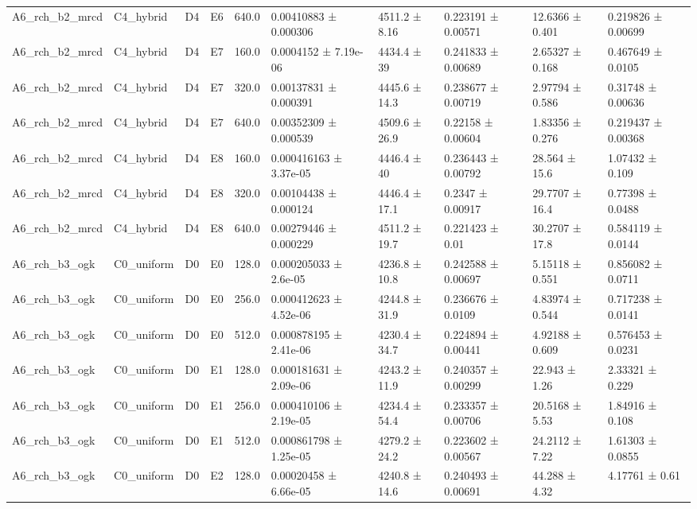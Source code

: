 \begin{table}
\begin{tabular}{llllllllll}
A6\_rch\_b2\_mrcd & C4\_hybrid & D4 & E6 & 640.0 & 0.00410883 ± 0.000306 & 4511.2 ± 8.16 & 0.223191 ± 0.00571 & 12.6366 ± 0.401 & 0.219826 ± 0.00699 \\
A6\_rch\_b2\_mrcd & C4\_hybrid & D4 & E7 & 160.0 & 0.0004152 ± 7.19e-06 & 4434.4 ± 39 & 0.241833 ± 0.00689 & 2.65327 ± 0.168 & 0.467649 ± 0.0105 \\
A6\_rch\_b2\_mrcd & C4\_hybrid & D4 & E7 & 320.0 & 0.00137831 ± 0.000391 & 4445.6 ± 14.3 & 0.238677 ± 0.00719 & 2.97794 ± 0.586 & 0.31748 ± 0.00636 \\
A6\_rch\_b2\_mrcd & C4\_hybrid & D4 & E7 & 640.0 & 0.00352309 ± 0.000539 & 4509.6 ± 26.9 & 0.22158 ± 0.00604 & 1.83356 ± 0.276 & 0.219437 ± 0.00368 \\
A6\_rch\_b2\_mrcd & C4\_hybrid & D4 & E8 & 160.0 & 0.000416163 ± 3.37e-05 & 4446.4 ± 40 & 0.236443 ± 0.00792 & 28.564 ± 15.6 & 1.07432 ± 0.109 \\
A6\_rch\_b2\_mrcd & C4\_hybrid & D4 & E8 & 320.0 & 0.00104438 ± 0.000124 & 4446.4 ± 17.1 & 0.2347 ± 0.00917 & 29.7707 ± 16.4 & 0.77398 ± 0.0488 \\
A6\_rch\_b2\_mrcd & C4\_hybrid & D4 & E8 & 640.0 & 0.00279446 ± 0.000229 & 4511.2 ± 19.7 & 0.221423 ± 0.01 & 30.2707 ± 17.8 & 0.584119 ± 0.0144 \\
A6\_rch\_b3\_ogk & C0\_uniform & D0 & E0 & 128.0 & 0.000205033 ± 2.6e-05 & 4236.8 ± 10.8 & 0.242588 ± 0.00697 & 5.15118 ± 0.551 & 0.856082 ± 0.0711 \\
A6\_rch\_b3\_ogk & C0\_uniform & D0 & E0 & 256.0 & 0.000412623 ± 4.52e-06 & 4244.8 ± 31.9 & 0.236676 ± 0.0109 & 4.83974 ± 0.544 & 0.717238 ± 0.0141 \\
A6\_rch\_b3\_ogk & C0\_uniform & D0 & E0 & 512.0 & 0.000878195 ± 2.41e-06 & 4230.4 ± 34.7 & 0.224894 ± 0.00441 & 4.92188 ± 0.609 & 0.576453 ± 0.0231 \\
A6\_rch\_b3\_ogk & C0\_uniform & D0 & E1 & 128.0 & 0.000181631 ± 2.09e-06 & 4243.2 ± 11.9 & 0.240357 ± 0.00299 & 22.943 ± 1.26 & 2.33321 ± 0.229 \\
A6\_rch\_b3\_ogk & C0\_uniform & D0 & E1 & 256.0 & 0.000410106 ± 2.19e-05 & 4234.4 ± 54.4 & 0.233357 ± 0.00706 & 20.5168 ± 5.53 & 1.84916 ± 0.108 \\
A6\_rch\_b3\_ogk & C0\_uniform & D0 & E1 & 512.0 & 0.000861798 ± 1.25e-05 & 4279.2 ± 24.2 & 0.223602 ± 0.00567 & 24.2112 ± 7.22 & 1.61303 ± 0.0855 \\
A6\_rch\_b3\_ogk & C0\_uniform & D0 & E2 & 128.0 & 0.00020458 ± 6.66e-05 & 4240.8 ± 14.6 & 0.240493 ± 0.00691 & 44.288 ± 4.32 & 4.17761 ± 0.61 \\

\end{tabular}
\end{table}
